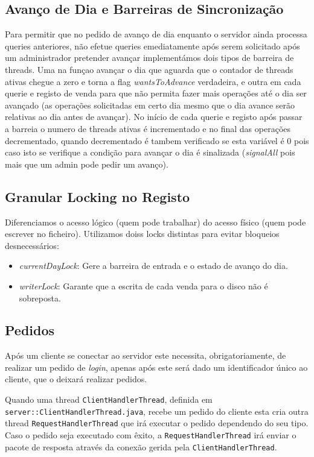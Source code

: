 \documentclass[runningheads]{llncs}
\begin{document}
\subsection{Avanço de Dia e Barreiras de Sincronização}
Para permitir que no pedido de avanço de dia enquanto o servidor ainda processa queries anteriores, não efetue queries emediatamente após serem solicitado após um administrador pretender avançar implementámos dois tipos de barreira de threads. Uma na funçao avançar o dia que aguarda que o contador de threads ativas chegue a zero e torna a flag \emph{wantsToAdvance} verdadeira, e outra em cada querie e registo de venda para que não permita fazer mais operações até o dia ser avançado (as operações solicitadas em certo dia mesmo que o dia avance serão relativas ao dia antes de avançar). No início de cada querie e registo  após passar a barreia o numero de threads ativas é incrementado e no final das operações decrementado, quando decrementado é tambem verificado se esta variável é 0 pois caso isto se verifique a condição para avançar o dia é sinalizada (\emph{signalAll} pois mais que um admin pode pedir um avanço).


\subsection{Granular Locking no Registo}
Diferenciamos o acesso lógico (quem pode trabalhar) do acesso físico (quem pode escrever no ficheiro). Utilizamos doiss locks distintas para evitar bloqueios desnecessários:
\begin{itemize}
    \item \emph{currentDayLock}: Gere a barreira de entrada e o estado de avanço do dia.
    \item \emph{writerLock}: Garante que a escrita de cada venda para o disco não é sobreposta.
\end{itemize}

\subsection{Pedidos}
Após um cliente se conectar ao servidor este necessita, obrigatoriamente, de realizar um pedido de \emph{login}, apenas após este será dado um identificador único ao cliente, que o deixará realizar pedidos.

Quando uma thread \texttt{ClientHandlerThread}, definida em \texttt{server::ClientHandlerThread.java}, recebe um pedido do cliente esta cria outra thread \texttt{RequestHandlerThread} que irá executar o pedido dependendo do seu tipo.
Caso o pedido seja executado com êxito, a \texttt{RequestHandlerThread} irá enviar o pacote de resposta através da conexão gerida pela \texttt{ClientHandlerThread}.
\end{document}
